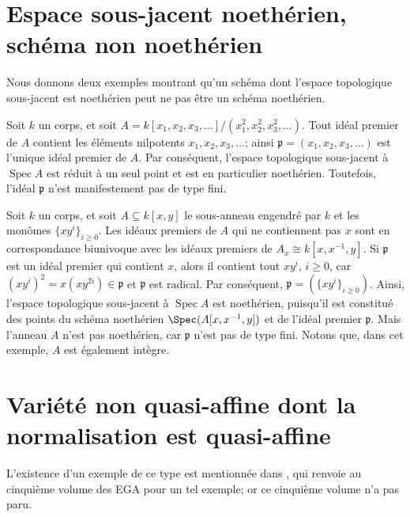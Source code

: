\section{Espace sous-jacent noethérien, schéma non noethérien}
\label{section-noetherian-not-noetherian}

\noindent
Nous donnons deux exemples montrant qu'un schéma dont l'espace topologique sous-jacent
est noethérien peut ne pas être un schéma noethérien.

\begin{example}
\label{example-many-variables}
Soit $k$ un corps, et soit $A = k[x_1, x_2, x_3, \dots] /
(x_1^2, x_2^2, x_3^2, \dots)$. Tout idéal premier de $A$ contient les
éléments nilpotents $x_1, x_2, x_3, \dots$; ainsi $\mathfrak p = (x_1, x_2, x_3,
\dots)$ est l'unique idéal premier de $A$. Par conséquent, l'espace
topologique sous-jacent à $\operatorname{Spec} A$ est réduit à un seul point et est
en particulier noethérien. Toutefois, l'idéal $\mathfrak p$ n'est manifestement pas
de type fini.
\end{example}

\begin{example}
\label{example-many-mononials}
Soit $k$ un corps, et soit $A \subseteq k[x, y]$ le
sous-anneau engendré par $k$ et les monômes $\{xy^i\}_{i \ge 0}$. Les idéaux
premiers de $A$ qui ne contiennent pas $x$ sont en correspondance biunivoque avec
les idéaux premiers de $A_x \cong k[x, x^{-1}, y]$. Si $\mathfrak p$ est un
idéal premier qui contient $x$, alors il contient tout $xy^i$, $i \ge 0$,
car $(xy^i)^2 = x(xy^{2i}) \in \mathfrak p$ et $\mathfrak p$ est
radical. Par conséquent, $\mathfrak p = (\{xy^i\}_{i \ge 0})$. Ainsi, l'espace
topologique sous-jacent à $\operatorname{Spec} A$ est noethérien, puisqu'il
est constitué des points du schéma noethérien
$\Spec(A[x, x^{-1}, y])$ et de l'idéal premier $\mathfrak p$.
Mais l'anneau $A$ n'est pas noethérien, car $\mathfrak p$
n'est pas de type fini. Notons que,
dans cet exemple, $A$ est également intègre.
\end{example}






\section{Variété non quasi-affine dont la normalisation est quasi-affine}
\label{section-nonquasi-affine}

\noindent
L'existence d'un exemple de ce type est mentionnée dans
\cite[II remarque 6.6.13]{EGA}, qui renvoie au cinquième volume des
EGA pour un tel exemple; or ce cinquième volume n'a pas paru.

